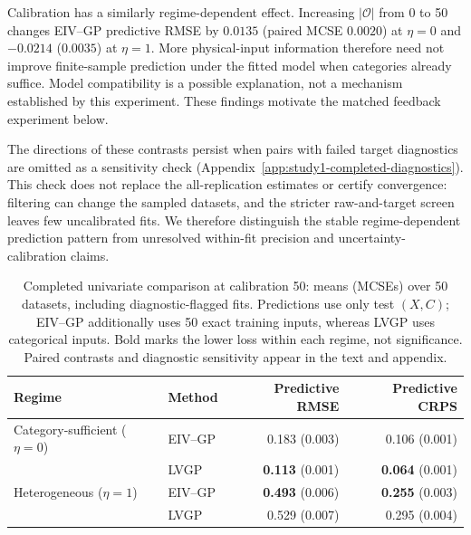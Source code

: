 Calibration has a similarly regime-dependent effect. Increasing $|\mathcal O|$ from 0 to 50 changes EIV--GP predictive RMSE by $0.0135$ (paired MCSE $0.0020$) at $\eta=0$ and $-0.0214$ ($0.0035$) at $\eta=1$. More physical-input information therefore need not improve finite-sample prediction under the fitted model when categories already suffice. Model compatibility is a possible explanation, not a mechanism established by this experiment. These findings motivate the matched feedback experiment below.

The directions of these contrasts persist when pairs with failed target diagnostics are omitted as a sensitivity check (Appendix~\ref{app:study1-completed-diagnostics}). This check does not replace the all-replication estimates or certify convergence: filtering can change the sampled datasets, and the stricter raw-and-target screen leaves few uncalibrated fits. We therefore distinguish the stable regime-dependent prediction pattern from unresolved within-fit precision and uncertainty-calibration claims.

\begin{table}[!htbp]
\centering\small
\caption{Completed univariate comparison at calibration 50: means (MCSEs) over 50 datasets, including diagnostic-flagged fits. Predictions use only test $(X,C)$; EIV--GP additionally uses 50 exact training inputs, whereas LVGP uses categorical inputs. Bold marks the lower loss within each regime, not significance. Paired contrasts and diagnostic sensitivity appear in the text and appendix.}
\label{tab:numerical-boundary}
\begin{tabular}{llrr}
\toprule
Regime & Method & Predictive RMSE & Predictive CRPS\\
\midrule
Category-sufficient ($\eta=0$) & EIV--GP & 0.183 (0.003) & 0.106 (0.001)\\
 & LVGP & \textbf{0.113} (0.001) & \textbf{0.064} (0.001)\\
Heterogeneous ($\eta=1$) & EIV--GP & \textbf{0.493} (0.006) & \textbf{0.255} (0.003)\\
 & LVGP & 0.529 (0.007) & 0.295 (0.004)\\
\bottomrule
\end{tabular}
\end{table}

